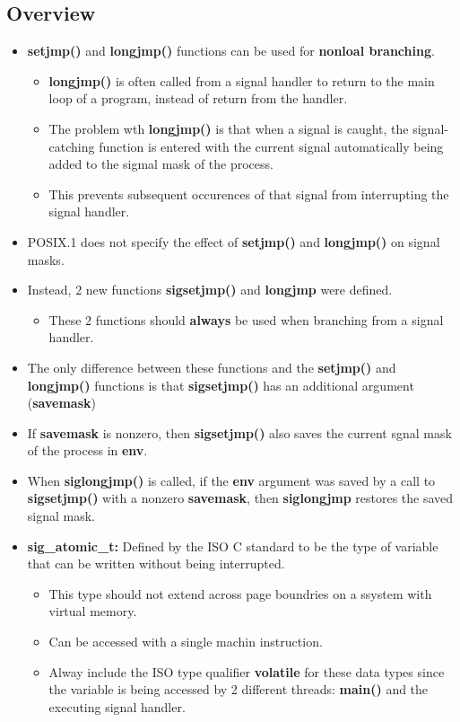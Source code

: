 \documentclass{article}
\begin{document}
\subsection{Overview}

\begin{itemize}
    \item \textbf{setjmp()} and \textbf{longjmp()} functions can be used for \textbf{nonloal branching}.
        \begin{itemize}
            \item \textbf{longjmp()} is often called from a signal handler to return to the main loop of a program, instead of return from the handler.
            \item The problem wth \textbf{longjmp()} is that when a signal is caught, the signal-catching function is entered with the current signal automatically being added to the sigmal mask of the process.
            \item This prevents subsequent occurences of that signal from interrupting the signal handler.
        \end{itemize}
    \item POSIX.1  does not specify the effect of \textbf{setjmp()} and \textbf{longjmp()} on signal masks.
    \item Instead, 2 new functions \textbf{sigsetjmp()} and \textbf{longjmp} were defined.
    \begin{itemize}
        \item These 2 functions should \textbf{always} be used when branching from a signal handler.
    \end{itemize}
    \item The only difference between these functions and the \textbf{setjmp()} and \textbf{longjmp()} functions is that \textbf{sigsetjmp()} has an additional argument (\textbf{savemask})
    \item If \textbf{savemask} is nonzero, then \textbf{sigsetjmp()} also saves the current sgnal mask of the process in \textbf{env}.
    \item When \textbf{siglongjmp()} is called, if the \textbf{env} argument was saved by a call to \textbf{sigsetjmp()} with a nonzero \textbf{savemask}, then \textbf{siglongjmp} restores the saved signal mask.

    \item \textbf{sig\_atomic\_t:} Defined by the ISO C standard to be the type of variable that can be written without being interrupted.
        \begin{itemize}
            \item This type should not extend across page boundries on a ssystem with virtual memory.
            \item Can be accessed with a single machin instruction.
            \item Alway include the ISO type qualifier \textbf{volatile} for these data types since the variable is being accessed by 2 different threads: \textbf{main()} and the executing signal handler.
        \end{itemize}
\end{itemize}
\end{document}
